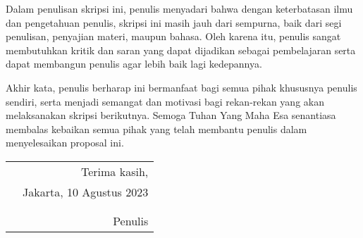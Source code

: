 \documentclass{jtetiskripsi}
\begin{document}
Dalam penulisan skripsi ini, penulis menyadari bahwa dengan keterbatasan ilmu dan pengetahuan penulis, skripsi ini masih jauh dari sempurna, baik dari segi penulisan, penyajian materi, maupun bahasa. Oleh karena itu, penulis sangat membutuhkan kritik dan saran yang dapat dijadikan sebagai pembelajaran serta dapat membangun penulis agar lebih baik lagi kedepannya.

Akhir kata, penulis berharap ini bermanfaat bagi semua pihak khususnya penulis sendiri, serta menjadi semangat dan motivasi bagi rekan-rekan yang akan melaksanakan skripsi berikutnya. Semoga Tuhan Yang Maha Esa senantiasa membalas kebaikan semua pihak yang telah membantu penulis dalam menyelesaikan proposal ini.


\begin{tabular}{p{8.5cm}r}
	&Terima kasih,\\
	&Jakarta, 10 Agustus 2023\\
	&\\
	&\\
	&Penulis
\end{tabular}
\end{document}
